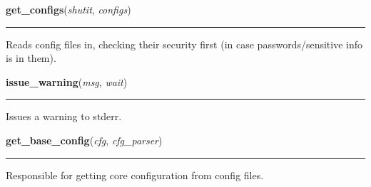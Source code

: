     \label{util:get_configs}

    \vspace{0.5ex}

\hspace{.8\funcindent}\begin{boxedminipage}{\funcwidth}

    \raggedright \textbf{get\_configs}(\textit{shutit}, \textit{configs})

    \vspace{-1.5ex}

    \rule{\textwidth}{0.5\fboxrule}
\setlength{\parskip}{2ex}
    Reads config files in, checking their security first (in case 
    passwords/sensitive info is in them).

\setlength{\parskip}{1ex}
    \end{boxedminipage}

    \label{util:issue_warning}

    \vspace{0.5ex}

\hspace{.8\funcindent}\begin{boxedminipage}{\funcwidth}

    \raggedright \textbf{issue\_warning}(\textit{msg}, \textit{wait})

    \vspace{-1.5ex}

    \rule{\textwidth}{0.5\fboxrule}
\setlength{\parskip}{2ex}
    Issues a warning to stderr.

\setlength{\parskip}{1ex}
    \end{boxedminipage}

    \label{util:get_base_config}

    \vspace{0.5ex}

\hspace{.8\funcindent}\begin{boxedminipage}{\funcwidth}

    \raggedright \textbf{get\_base\_config}(\textit{cfg}, \textit{cfg\_parser})

    \vspace{-1.5ex}

    \rule{\textwidth}{0.5\fboxrule}
\setlength{\parskip}{2ex}
    Responsible for getting core configuration from config files.

\setlength{\parskip}{1ex}
    \end{boxedminipage}

